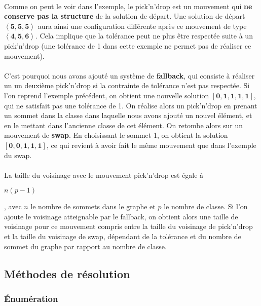 \documentclass[12pt]{article}
\begin{document}
\paragraph{}Comme on peut le voir dans l'exemple, le pick'n'drop est un mouvement qui \textbf{ne conserve pas la structure} de la solution de départ. Une solution de départ $\mathbf{\left\langle 5,5,5 \right\rangle}$ aura ainsi une configuration différente après ce mouvement de type $\mathbf{\left\langle 4,5,6 \right\rangle}$. Cela implique que la tolérance peut ne plus être respectée suite à un pick'n'drop (une tolérance de 1 dans cette exemple ne permet pas de réaliser ce mouvement).
\paragraph{}C'est pourquoi nous avons ajouté un système de \textbf{fallback}, qui consiste à réaliser un un deuxième pick'n'drop si la contrainte de tolérance n'est pas respectée. Si l'on reprend l'exemple précédent, on obtient une nouvelle solution 
$\mathbf{[0,1,1,1,1]}$, qui ne satisfait pas une tolérance de 1. On réalise alors un pick'n'drop en prenant un sommet dans la classe dans laquelle nous avons ajouté un nouvel élément, et en le mettant dans l'ancienne classe de cet élément. On retombe alors sur un mouvement de \textbf{swap}. En choisissant le sommet 1, on obtient la solution $\mathbf{[0,0,1,1,1]}$, ce qui revient à avoir fait le même mouvement que dans l'exemple du swap.

\paragraph{}La taille du voisinage avec le mouvement pick'n'drop est égale à
\begin{large}$n\left(p-1\right)$\end{large}, avec $n$ le nombre de sommets dans le graphe et $p$ le nombre de classe. Si l'on ajoute le voisinage atteignable par le fallback, on obtient alors une taille de voisinage pour ce mouvement compris entre la taille du voisinage de pick'n'drop et la taille du voisinage de swap, dépendant de la tolérance et du nombre de sommet du graphe par rapport au nombre de classe.

\subsection{Méthodes de résolution}

\subsubsection{Énumération}
\end{document}
